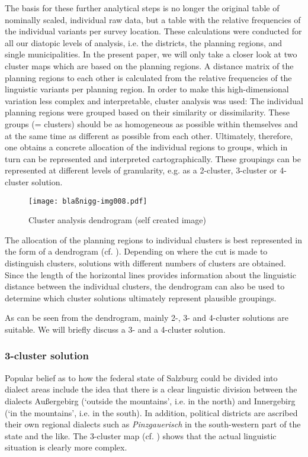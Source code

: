 \documentclass[output=paper,colorlinks, citecolor=brown]{langscibook}
\begin{document}
The basis for these further analytical steps is no longer the original table of nominally scaled, individual raw data, but a table with the relative frequencies of the individual variants per survey location. These calculations were conducted for all our diatopic levels of analysis, i.e. the districts, the planning regions, and single municipalities. In the present paper, we will only take a closer look at two cluster maps which are based on the planning regions. A distance matrix of the planning regions to each other is calculated from the relative frequencies of the linguistic variants per planning region. In order to make this high-dimensional variation less complex and interpretable, cluster analysis was used: The individual planning regions were grouped based on their similarity or dissimilarity. These groups (= clusters) should be as homogeneous as possible within themselves and at the same time as different as possible from each other. Ultimately, therefore, one obtains a concrete allocation of the individual regions to groups, which in turn can be represented and interpreted cartographically. These groupings can be represented at different levels of granularity, e.g. as a 2-cluster, 3-cluster or 4-cluster solution. 

\begin{figure}
\texttt{[image: blaßnigg-img008.pdf]}
\caption{Cluster analysis dendrogram (self created image)}
\label{fig:blaßnigg:8}
\end{figure}

The allocation of the planning regions to individual clusters is best represented in the form of a dendrogram (cf. ). Depending on where the cut is made to distinguish clusters, solutions with different numbers of clusters are obtained. Since the length of the horizontal lines provides information about the linguistic distance between the individual clusters, the dendrogram can also be used to determine which cluster solutions ultimately represent plausible groupings.

As can be seen from the dendrogram, mainly 2-, 3- and 4-cluster solutions are suitable. We will briefly discuss a 3- and a 4-cluster solution.

\subsubsection{3-cluster solution} \label{sec:blaßnigg:3.3.2}

Popular belief as to how the federal state of Salzburg could be divided into dialect areas include the idea that there is a clear linguistic division between the dialects Außergebirg (`outside the mountains', i.e. in the north) and Innergebirg (`in the mountains', i.e. in the south). In addition, political districts are ascribed their own regional dialects such as \textit{Pinzgauerisch} in the south-western part of the state and the like. The 3-cluster map (cf. ) shows that the actual linguistic situation is clearly more complex.
\end{document}
